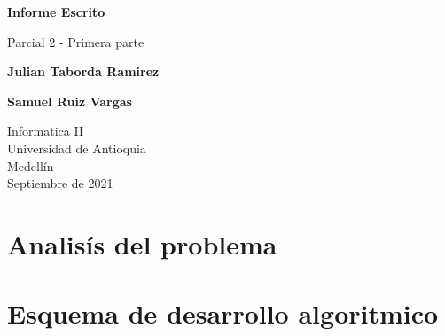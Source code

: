 \documentclass{article}
\begin{document}
\begin{titlepage}
    \begin{center}
        \vspace*{1cm}
            
        \Huge
        \textbf{Informe Escrito}
            
        \vspace{0.5cm}
        \LARGE
        Parcial 2 - Primera parte
            
        \vspace{1.5cm}
            
        \textbf{Julian Taborda Ramirez}
        
        \vspace{0.5cm}
        
        \textbf{Samuel Ruiz Vargas}
            
        \vfill
            
        \vspace{0.8cm}
            
        \Large
        Informatica II\\
        Universidad de Antioquia\\
        Medellín\\
        Septiembre de 2021
            
    \end{center}
\end{titlepage}

\tableofcontents
\vspace*{1.2cm}

\newpage

\section{Analisís del problema}
\label{analisis}
    \begin{flushleft}
        
    \end{flushleft}
    \vspace*{2cm}
    
\section{Esquema de desarrollo algoritmico}
\label{esquema}
    \begin{flushleft}

    \end{flushleft}
\newpage
    
\end{document}

